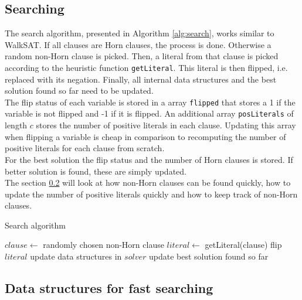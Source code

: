 \documentclass[12pt,a4paper]{article}
\begin{document}
\subsection{Searching}
The search algorithm, presented in Algorithm \ref{alg:search}, works similar to WalkSAT. If all clauses are Horn clauses, the process is done. Otherwise a random non-Horn clause is picked. Then, a literal from that clause is picked according to the heuristic function \texttt{getLiteral}. This literal is then flipped, i.e. replaced with its negation. Finally, all internal data structures and the best solution found so far need to be updated.\\
The flip status of each variable is stored in a array \texttt{flipped} that stores a 1 if the variable is not flipped and -1 if it is flipped. An additional array \texttt{posLiterals} of length $c$ stores the number of positive literals in each clause. Updating this array when flipping a variable is cheap in comparison to recomputing the number of positive literals for each clause from scratch. \\
For the best solution the flip status and the number of Horn clauses is stored. If better solution is found, these are simply updated.\\
The section \ref{sec:dat_struc_fast_search} will look at how non-Horn clauses can be found quickly, how to update the number of positive literals quickly and how to keep track of non-Horn clauses.
\begin{algorithm}[ht]
  \caption{Search algorithm}
  \label{alg:search}
  \begin{algorithmic}[1] 
    \State \Return{}
    \EndIf
    \State $clause \leftarrow$ randomly chosen non-Horn clause
    \State $literal \leftarrow$ getLiteral(clause)
    \State flip $literal$
    \State update data structures in $solver$
    \State update best solution found so far
    \EndFor
    \EndProcedure
  \end{algorithmic}
\end{algorithm}
\subsection{Data structures for fast searching}
\label{sec:dat_struc_fast_search}
\end{document}
